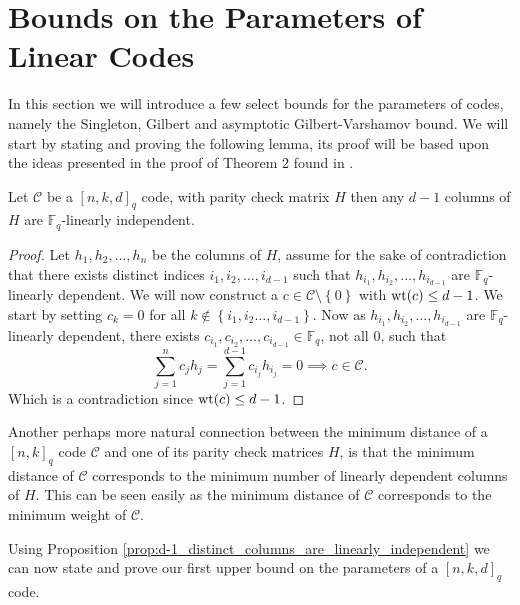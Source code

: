 \section{Bounds on the Parameters of Linear Codes}\label{sec:bounds}
In this section we will introduce a few select bounds for the parameters of codes, namely the Singleton, Gilbert and asymptotic Gilbert-Varshamov bound. We will start by stating and proving the following lemma, its proof will be based upon the ideas presented in the proof of Theorem 2 found in \cite{the_singleton_bound_and_rs_code}. %

\begin{proposition}\label{prop:d-1_distinct_columns_are_linearly_independent}
  Let $\mathcal{C}$ be a $[n, k, d]_q$ code, with parity check matrix $H$ then any $d-1$ columns of $H$ are $\mathbb{F}_{q}$-linearly independent.
\end{proposition}

\begin{proof}
  Let $h_1, h_{2}, \ldots, h_n$ be the columns of $H$, assume for the sake of contradiction that there exists distinct indices $i_1, i_2, \ldots, i_{d-1}$ such that $h_{i_{1}}, h_{i_{2}}, \ldots, h_{i_{d-1}}$ are $\mathbb{F}_{q}$-linearly dependent.
  We will now construct a $c \in \mathcal{C} \setminus \left\{0\right\}$ with $\mathrm{wt}(c) \leq d - 1$. We start by setting $c_{k} = 0$ for all $k \not \in \left\{i_1, i_2 \ldots, i_{d-1}\right\}$. Now as $h_{i_{1}}, h_{i_{2}}, \ldots, h_{i_{d-1}}$ are $\mathbb{F}_{q}$-linearly dependent, there exists $c_{i_{1}}, c_{i_{2}}, \ldots, c_{i_{d-1}} \in \mathbb{F}_{q}$, not all $0$, such that
  \begin{equation*}
    \sum^{n}_{j = 1} c_{j}h_{j} = \sum^{d - 1}_{j = 1} c_{i_{j}}h_{i_j} = 0 \implies c \in \mathcal{C}.
  \end{equation*}
  Which is a contradiction since $\mathrm{wt}(c) \leq d - 1$.
\end{proof}
\begin{remark}\label{rem:minimum_distance_coresponds_to_minimum_number_of_linearly_dependent_columns}
Another perhaps more natural connection between the minimum distance of a $[n, k]_{q}$ code $\mathcal{C}$ and one of its  parity check matrices $H$, is that the minimum distance of $\mathcal{C}$ corresponds to the minimum number of linearly dependent columns of $H$. This can be seen easily as the minimum distance of $\mathcal{C}$ corresponds to the minimum weight of $\mathcal{C}$.
\end{remark}
Using Proposition \ref{prop:d-1_distinct_columns_are_linearly_independent} we can now state and prove our first upper bound on the parameters of a $[n, k, d]_{q}$ code.

